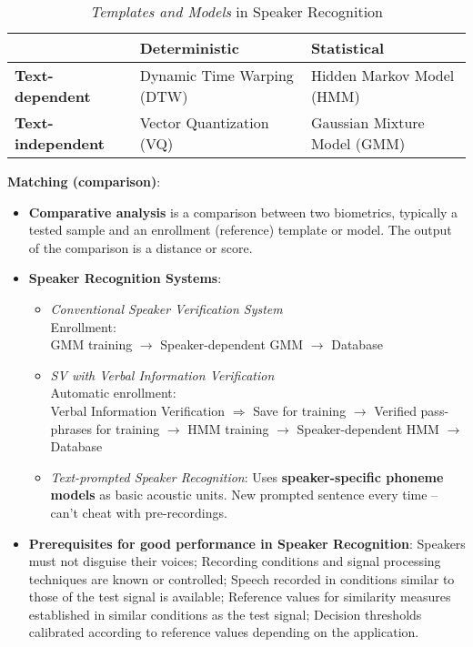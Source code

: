\documentclass[a4paper]{article}
\begin{document}
        \begin{table}[htp]
          \centering
          \begin{tabular}{lll}
          \toprule
          & \textbf{Deterministic}    & \textbf{Statistical}   \\
          \midrule
          \textbf{Text-dependent}       & Dynamic Time Warping (DTW) & Hidden Markov Model (HMM)      \\
          \textbf{Text-independent}     & Vector Quantization (VQ)   & Gaussian Mixture Model (GMM)   \\
          \bottomrule
          \end{tabular}
          \caption{\emph{Templates and Models} in Speaker Recognition}
          \label{tab:spk}
        \end{table}

      \textbf{Matching (comparison)}:
      \begin{itemize}
        \item \textbf{Comparative analysis} is a comparison between two biometrics, typically a tested sample and an enrollment (reference) template or model. The output of the comparison is a distance or score.
        \item \textbf{Speaker Recognition Systems}:
        \begin{itemize}
          \item \emph{Conventional Speaker Verification System}\\Enrollment: \\
          GMM training $\rightarrow$ Speaker-dependent GMM $\rightarrow$ Database
          \item \emph{SV with Verbal Information Verification}\\Automatic enrollment: \\
          Verbal Information Verification $\Rightarrow$ Save for training $\rightarrow$ Verified pass-phrases for training $\rightarrow$ HMM training $\rightarrow$ Speaker-dependent HMM $\rightarrow$ Database
          \item \emph{Text-prompted Speaker Recognition}: Uses \textbf{speaker-specific phoneme models} as basic acoustic units. New prompted sentence every time -- can't cheat with pre-recordings.
        \end{itemize}
        \item \textbf{Prerequisites for good performance in Speaker Recognition}: Speakers must not disguise their voices; Recording conditions and signal processing techniques are known or controlled; Speech recorded in conditions similar to those of the test signal is available; Reference values for similarity measures established in similar conditions as the test signal; Decision thresholds calibrated according to reference values depending on the application.
      \end{itemize}
    \newpage
\end{document}

